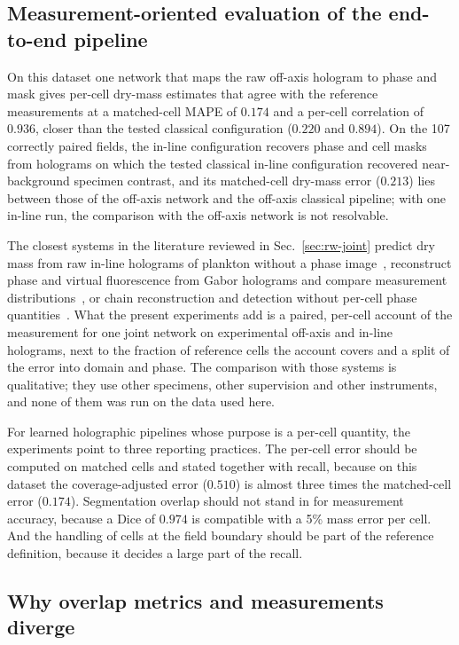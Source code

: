 \documentclass[11pt]{article}
\begin{document}
\subsection{Measurement-oriented evaluation of the end-to-end pipeline}
\label{sec:disc-baseline}

On this dataset one network that maps the raw off-axis hologram to phase and
mask gives per-cell dry-mass estimates that agree with the reference
measurements at a matched-cell MAPE of $0.174$ and a per-cell correlation of
$0.936$, closer than the tested classical configuration ($0.220$ and $0.894$).
On the 107 correctly paired fields, the in-line configuration recovers phase and
cell masks from holograms on which the tested classical in-line configuration
recovered near-background specimen contrast, and its matched-cell dry-mass error ($0.213$)
lies between those of the off-axis network and the off-axis classical pipeline;
with one in-line run, the comparison with the off-axis network is not
resolvable.

The closest systems in the literature reviewed in Sec.~\ref{sec:rw-joint}
predict dry mass from raw in-line holograms of plankton without a phase
image~\cite{bachimanchi2022microplankton}, reconstruct phase and virtual
fluorescence from Gabor holograms and compare measurement
distributions~\cite{park2026ai}, or chain reconstruction and detection without
per-cell phase quantities~\cite{delikoyun2025rthad}. What the present
experiments add is a paired, per-cell account of the measurement for one joint
network on experimental off-axis and in-line holograms, next to the fraction of
reference cells the account covers and a split of the error into domain and
phase. The comparison with those systems is qualitative; they use other
specimens, other supervision and other instruments, and none of them was run on
the data used here.

For learned holographic pipelines whose purpose is a per-cell quantity, the
experiments point to three reporting practices. The per-cell error should be
computed on matched cells and stated together with recall, because on this
dataset the coverage-adjusted error ($0.510$) is almost three times the
matched-cell error ($0.174$). Segmentation overlap should not stand in for
measurement accuracy, because a Dice of $0.974$ is compatible with a 5\% mass
error per cell. And the handling of cells at the field boundary should be part
of the reference definition, because it decides a large part of the recall.

\subsection{Why overlap metrics and measurements diverge}
\label{sec:disc-divergence}
\end{document}

